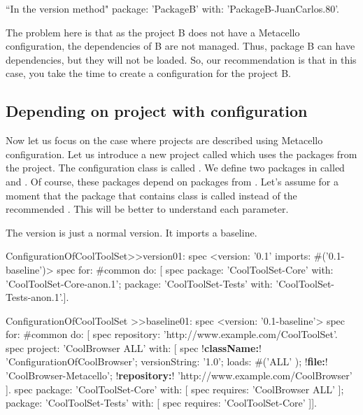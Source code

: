 \documentclass[a4paper,10pt,twoside]{book}
\begin{document}
\begin{code}{}
		``In the version method"
		package: 'PackageB' with: 'PackageB-JuanCarlos.80'.
\end{code}

The problem here is that as the project B does not have a Metacello configuration, the dependencies of B are not managed. Thus, package B can have dependencies, but they will not be loaded. So, our recommendation is that in this case, you take the time to create a configuration for the project B.

\subsection{Depending on project with configuration}
Now let us focus on the case where projects are described using Metacello configuration.
Let us introduce a new project called  which uses the packages from the  project. The configuration class is called . We define two packages in  called  and . Of course, these packages depend on packages from . Let's assume for a moment that the package that contains  class is called  instead of the recommended . This will be better to understand each parameter. 


The version is just a normal version. It imports a baseline. 
\begin{code}{}
ConfigurationOfCoolToolSet>>version01: spec 
	<version: '0.1' imports: #('0.1-baseline')>
	spec for: #common do: [
		spec 
			package: 'CoolToolSet-Core' with: 'CoolToolSet-Core-anon.1';
			package: 'CoolToolSet-Tests' with: 'CoolToolSet-Tests-anon.1'.].	
\end{code}	



\begin{code}{}
ConfigurationOfCoolToolSet >>baseline01: spec 
	<version: '0.1-baseline'>
	spec for: #common do: [
		spec repository: 'http://www.example.com/CoolToolSet'.
		spec project: 'CoolBrowser ALL' with: [
				spec 
				    !\textbf{className:}! 'ConfigurationOfCoolBrowser';
					versionString: '1.0';
					loads: #('ALL' );
					!\textbf{file:}! 'CoolBrowser-Metacello';
					!\textbf{repository:}! 'http://www.example.com/CoolBrowser' ].
		spec 
			package: 'CoolToolSet-Core' with: [ spec requires: 'CoolBrowser ALL' ];
			package: 'CoolToolSet-Tests' with: [ spec requires: 'CoolToolSet-Core' ]].
\end{code}	
\end{document}
